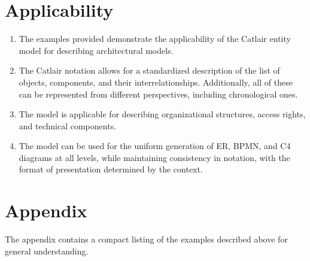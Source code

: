 \documentclass[final]{article}
\begin{document}
    \section{Applicability}

        \begin{enumerate}

            \item The examples provided demonstrate the applicability of the Catlair entity model for describing architectural models.

            \item The Catlair notation allows for a standardized description of the list of objects, components, and their interrelationships. Additionally, all of these can be represented from different perspectives, including chronological ones.

            \item The model is applicable for describing organizational structures, access rights, and technical components.

            \item The model can be used for the uniform generation of ER, BPMN, and C4 diagrams at all levels, while maintaining consistency in notation, with the format of presentation determined by the context.

        \end{enumerate}


    \section{Appendix}

        The appendix contains a compact listing of the examples described above 
        for general understanding.
\end{document}

